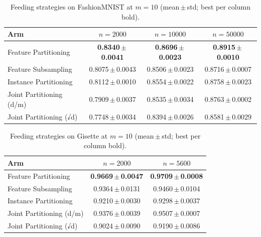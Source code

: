 \begin{table}[ht]
\centering\small
\begin{tabular}{lccc}
\toprule
Arm & $n{=}2000$ & $n{=}10000$ & $n{=}50000$ \\
\midrule
Feature Partitioning & \textbf{0.8340\,$\pm$\,0.0041} & \textbf{0.8696\,$\pm$\,0.0023} & \textbf{0.8915\,$\pm$\,0.0010} \\
Feature Subsampling & 0.8075\,$\pm$\,0.0043 & 0.8506\,$\pm$\,0.0023 & 0.8716\,$\pm$\,0.0007 \\
Instance Partitioning & 0.8112\,$\pm$\,0.0010 & 0.8554\,$\pm$\,0.0022 & 0.8758\,$\pm$\,0.0023 \\
Joint Partitioning (d/m) & 0.7909\,$\pm$\,0.0037 & 0.8535\,$\pm$\,0.0034 & 0.8763\,$\pm$\,0.0002 \\
Joint Partitioning (√d) & 0.7748\,$\pm$\,0.0034 & 0.8394\,$\pm$\,0.0026 & 0.8581\,$\pm$\,0.0029 \\
\bottomrule
\end{tabular}
\caption{Feeding strategies on FashionMNIST at $m=10$ (mean\,$\pm$\,std; best per column bold).}
\label{tab:feed_fashionmnist}
\end{table}

\begin{table}[ht]
\centering\small
\begin{tabular}{lcc}
\toprule
Arm & $n{=}2000$ & $n{=}5600$ \\
\midrule
Feature Partitioning & \textbf{0.9669\,$\pm$\,0.0047} & \textbf{0.9709\,$\pm$\,0.0008} \\
Feature Subsampling & 0.9364\,$\pm$\,0.0131 & 0.9460\,$\pm$\,0.0104 \\
Instance Partitioning & 0.9210\,$\pm$\,0.0030 & 0.9298\,$\pm$\,0.0037 \\
Joint Partitioning (d/m) & 0.9376\,$\pm$\,0.0039 & 0.9507\,$\pm$\,0.0007 \\
Joint Partitioning (√d) & 0.9024\,$\pm$\,0.0090 & 0.9190\,$\pm$\,0.0086 \\
\bottomrule
\end{tabular}
\caption{Feeding strategies on Gisette at $m=10$ (mean\,$\pm$\,std; best per column bold).}
\label{tab:feed_gisette}
\end{table}
